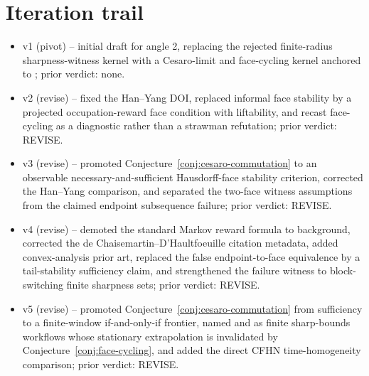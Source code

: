 \documentclass[11pt]{article}
\theoremstyle{definition}
\theoremstyle{plain}
\theoremstyle{remark}
\begin{document}
\section{Iteration trail}
\begin{itemize}[leftmargin=*]
\item v1 (pivot) -- initial draft for angle 2, replacing the rejected finite-radius sharpness-witness kernel with a Cesaro-limit and face-cycling kernel anchored to \citet{Han2021}; prior verdict: none.
\item v2 (revise) -- fixed the Han--Yang DOI, replaced informal face stability by a projected occupation-reward face condition with liftability, and recast face-cycling as a diagnostic rather than a strawman refutation; prior verdict: REVISE.
\item v3 (revise) -- promoted Conjecture~\ref{conj:cesaro-commutation} to an observable necessary-and-sufficient Hausdorff-face stability criterion, corrected the Han--Yang comparison, and separated the two-face witness assumptions from the claimed endpoint subsequence failure; prior verdict: REVISE.
\item v4 (revise) -- demoted the standard Markov reward formula to background, corrected the de Chaisemartin--D'Haultfoeuille citation metadata, added convex-analysis prior art, replaced the false endpoint-to-face equivalence by a tail-stability sufficiency claim, and strengthened the failure witness to block-switching finite sharpness sets; prior verdict: REVISE.
\item v5 (revise) -- promoted Conjecture~\ref{conj:cesaro-commutation} from sufficiency to a finite-window if-and-only-if frontier, named \citet{KalouptsidiKitamuraLimaSouzaRodrigues2020} and \citet{DuarteFinkelsteinKnoxMummoloShpitser2024} as finite sharp-bounds workflows whose stationary extrapolation is invalidated by Conjecture~\ref{conj:face-cycling}, and added the direct CFHN time-homogeneity comparison; prior verdict: REVISE.
\end{itemize}
\end{document}
